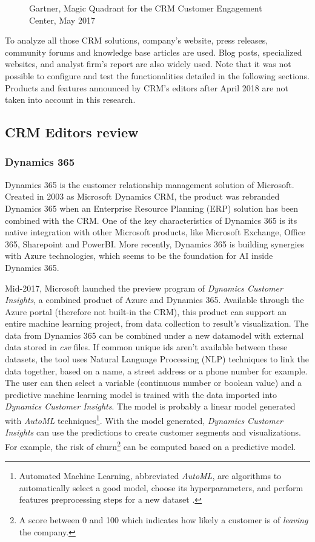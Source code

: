 \begin{figure}[!h]
\begin{minipage}[c]{0.49\linewidth}
        \caption[Magic Quadrant for the CRM Customer Engagement Center]{Gartner, Magic Quadrant for the CRM Customer Engagement Center, May 2017}
        \label{fig:magic-quadrant-customer-engagement}
    \end{minipage}
\end{figure}

To analyze all those CRM solutions, company's website, press releases, community forums and knowledge base articles are used. Blog posts, specialized websites, and analyst firm's report are also widely used. Note that it was not possible to configure and test the functionalities detailed in the following sections. Products and features announced by CRM's editors after April 2018 are not taken into account in this research.

\subsection{CRM Editors review}

\subsubsection*{Dynamics 365}
Dynamics 365 is the customer relationship management solution of Microsoft. Created in 2003 as Microsoft Dynamics CRM, the product was rebranded Dynamics 365 when an Enterprise Resource Planning (ERP) solution has been combined with the CRM. One of the key characteristics of Dynamics 365 is its native integration with other Microsoft products, like Microsoft Exchange, Office 365, Sharepoint and PowerBI. More recently, Dynamics 365 is building synergies with Azure technologies, which seems to be the foundation for AI inside Dynamics 365. 

Mid-2017, Microsoft launched the preview program of \textit{Dynamics Customer Insights}, a combined product of Azure and Dynamics 365. Available through the Azure portal (therefore not built-in the CRM), this product can support an entire machine learning project, from data collection to result's visualization. The data from Dynamics 365 can be combined under a new datamodel with external data stored in \textit{csv} files. If common unique ids aren't available between these datasets, the tool uses Natural Language Processing (NLP) techniques to link the data together, based on a name, a street address or a phone number for example. The user can then select a variable (continuous number or boolean value) and a predictive machine learning model is trained with the data imported into \textit{Dynamics Customer Insights}. The model is probably a linear model generated with \textit{AutoML} techniques\footnote{Automated Machine Learning, abbreviated \textit{AutoML}, are algorithms to automatically select a good model, choose its hyperparameters, and perform features preprocessing steps for a new dataset \cite{NIPS2015_5872}.}. With the model generated, \textit{Dynamics Customer Insights} can use the predictions to create customer segments and visualizations. For example, the risk of churn\footnote{A score between 0 and 100 which indicates how likely a customer is of \textit{leaving} the company.} can be computed based on a predictive model.

